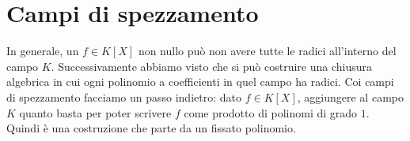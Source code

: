
\section{Campi di spezzamento}

%
%

In generale, un \(f \in K[X]\) non nullo può non avere tutte le radici all'interno del campo \(K\). Successivamente abbiamo visto che si può costruire una chiusura algebrica in cui ogni polinomio a coefficienti in quel campo ha radici. Coi campi di spezzamento facciamo un passo indietro: dato \(f \in K[X]\), aggiungere al campo \(K\) quanto basta per poter scrivere \(f\) come prodotto di polinomi di grado \(1\). Quindi è una costruzione che parte da un fissato polinomio.

